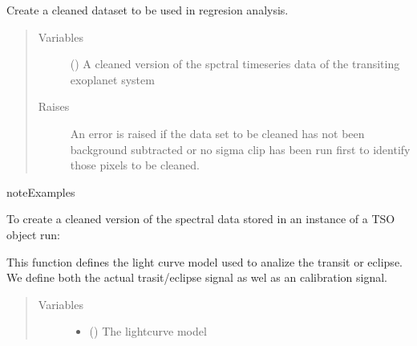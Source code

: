 \documentclass[a4paper,10pt,english]{sphinxmanual}
\begin{document}
\begin{fulllineitems}
\begin{fulllineitems}
\label{\detokenize{cascade.TSO:cascade.TSO.TSO.TSOSuite.create_cleaned_dataset}}
Create a cleaned dataset to be used in regresion analysis.
\begin{quote}\begin{description}
\item[{Variables}] \leavevmode
{} () \textendash{} A cleaned version of the spctral timeseries data of the transiting
exoplanet system

\item[{Raises}] \leavevmode
{} \textendash{} An error is raised if the data set to be cleaned has not been
background subtracted or no sigma clip has been run first to
identify those pixels to be cleaned.

\end{description}\end{quote}

\begin{sphinxadmonition}{note}{Examples}

To create a cleaned version of the spectral data stored in an instance
of a TSO object run:

%
\begin{sphinxVerbatim}[commandchars=\\\{\}]
\end{sphinxVerbatim}
\end{sphinxadmonition}

\end{fulllineitems}


\begin{fulllineitems}
\label{\detokenize{cascade.TSO:cascade.TSO.TSO.TSOSuite.define_eclipse_model}}
This function defines the light curve model used to analize the
transit or eclipse. We define both the actual trasit/eclipse signal
as wel as an calibration signal.
\begin{quote}\begin{description}
\item[{Variables}] \leavevmode\begin{itemize}
\item {} 
 () \textendash{} The lightcurve model


\end{itemize}
\end{description}
\end{quote}
\end{fulllineitems}
\end{fulllineitems}
\end{document}
